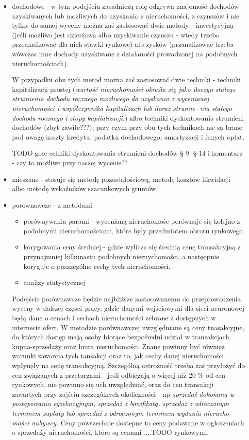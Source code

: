 \documentclass[a4paper,12pt,twoside,openany]{report}
\begin{document}
\begin{itemize}
\item dochodowe - w tym podejściu zasadniczą rolę odgrywa znajomość dochodów uzyskiwanych lub możliwych do uzyskania z nieruchomości, z czynszów i nie tylko; do samej wyceny można zaś zastosować dwie metody -  inwestycyjną (jeśli możliwa jest dzierżawa albo uzyskiwanie czynszu - wtedy trzeba przeanalizować dla nich stawki rynkowe) alb zysków (przanalizować trzeba wówczas inne dochody uzyskiwane z działaności prowadzonej na podobnych nieruchomościach).

W przypadku obu tych metod można zaś zastosować dwie techniki - techniki kapitalizacji prostej (\textit{wartość nieruchomości określa się jako iloczyn stałego strumienia dochodu rocznego możliwego do uzyskania z wycenianej nieruchomości i współczynnika kapitalizacji lub iloraz strumie-
nia stałego dochodu rocznego i stopy kapitalizacji.}) albo techniki dyskontowania strumieni dochodów (zbyt zawiłe???), przy czym przy obu tych technikach nie są brane pod uwagę koszty kredytu, podatku dochodowego, amortyzacji i innych opłat.

TODO gołe echniki dyskontowania strumieni dochodów § 9.-§ 14 i komentarz - czy to możliwe przy naszej wycenie??


\item mieszane - stosuje się metodę pozostałościową, metodę kosztów likwidacji albo metodę wskaźników szacunkowych gruntów
\item porównawcze - z metodami 
\begin{itemize}
\item porównywania parami - wycenianą nieruchomośc porównuje się kolejno z podobnymi nieruchomościami, które były przedmiotem obrotu rynkowego
\item korygowania ceny średniej - gdzie wylicza się średnią cenę transakcyjną z przynajmniej kilkunastu podobnych nieruychomości, a nastęopnie koryguje o poszzególne cechy tych nieruchomości.
\item  analizy statystycznej
\end{itemize}
Podejście porównawcze będzie najbliższe zastosowanemu do przeprowadzenia wyceny w dalszej części pracy, gdzie danymi wejściowymi dla sieci neuronowej będą dane o  cenach i cechach nieruchomości zebrane z dostępnych w internecie ofert.
W metodzie porównawczej uwzględniane są ceny tnasakcyjne, do których dostęp mają osoby biorące bezpośredni udział w transakcjach kupna-sprzedaży oraz biura nieruchomości. Znane powinny być również warunki zawarcia tych tansakcji  oraz to, jak cechy danej nieruchomości wpłynęły na cenę transakcyjną. Szczególną ostrożność trzeba zaś przyłożyć do cen związanych z przetargami - jesli odbiegają o więcej niż 20 \% od cen rynkowych, nie powinno się uch uwzględniać, oraz do cen transakcji zawartych przy zajściu szczególnych okoliczności - np \textit{sprzedaż dokonaną w postępowaniu egzekucyjnym,
sprzedaż z bonifikatą, sprzedaż z odroczonym terminem zapłaty lub sprzedaż z odroczonym terminem wydania nierucho-
mości nabywcy.}
Ceny powszechnie dostepne to ceny podawane w ogłoszeniach o sprzedaży nieruchomości, które są cenami ....TODO rynkowymi.


\end {itemize}
\end{document}

